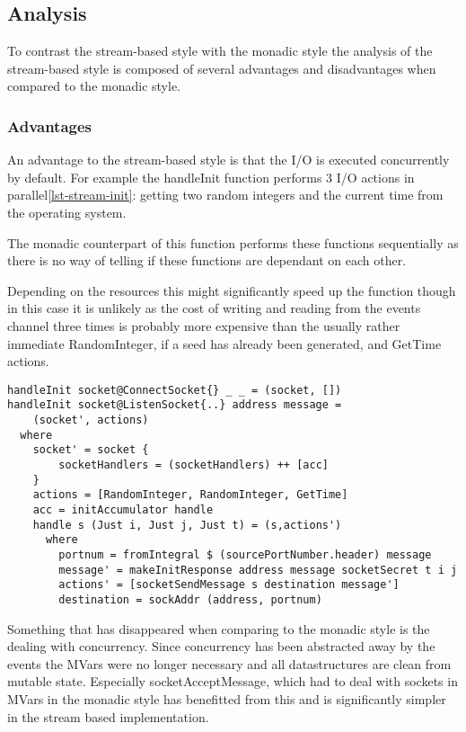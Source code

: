 \subsection{Analysis}
To contrast the stream-based style with the monadic style the analysis of the stream-based style is composed of several advantages and disadvantages when compared to the monadic style.

\subsubsection{Advantages}
An advantage to the stream-based style is that the I/O is executed concurrently by default. For example the handleInit function performs 3 I/O actions in parallel\ref{lst-stream-init}: getting two random integers and the current time from the operating system. 

The monadic counterpart of this function performs these functions sequentially as there is no way of telling if these functions are dependant on each other.

Depending on the resources this might significantly speed up the function though in this case it is unlikely as the cost of writing and reading from the events channel three times is probably more expensive than the usually rather immediate RandomInteger, if a seed has already been generated, and GetTime actions. 

\begin{lstlisting}[caption={The init handler}, label={lst-stream-init}]
handleInit socket@ConnectSocket{} _ _ = (socket, [])
handleInit socket@ListenSocket{..} address message =
    (socket', actions)
  where
    socket' = socket { 
        socketHandlers = (socketHandlers) ++ [acc]
    }
    actions = [RandomInteger, RandomInteger, GetTime]
    acc = initAccumulator handle
    handle s (Just i, Just j, Just t) = (s,actions')
      where
        portnum = fromIntegral $ (sourcePortNumber.header) message
        message' = makeInitResponse address message socketSecret t i j
        actions' = [socketSendMessage s destination message']
        destination = sockAddr (address, portnum)
\end{lstlisting}

Something that has disappeared when comparing to the monadic style is the dealing with concurrency. Since concurrency has been abstracted away by the events the MVars were no longer necessary and all datastructures are clean from mutable state.
Especially socketAcceptMessage, which had to deal with sockets in MVars in the monadic style has benefitted from this and is significantly simpler in the stream based implementation.

